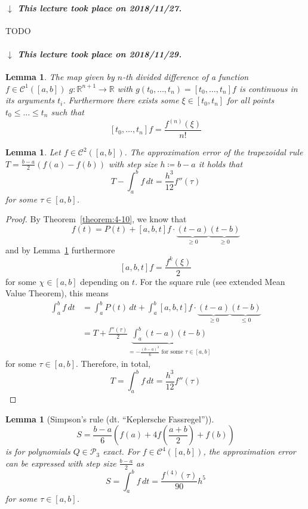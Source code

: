 \documentclass[a4paper]{article}
\newcounter{lecref}[section]
\numberwithin{lecref}{section}
\theoremstyle{break}
\newtheorem{lemma}[lecref]{Lemma}
\newcommand{\dateref}[1]{%
  \begin{mdframed}[backgroundcolor=gray!10,innerbottommargin=0pt,innertopmargin=0pt]
    \paragraph{\textit{$\downarrow$ This lecture took place on #1.}}%
  \end{mdframed}%
}
\newcommand{\dt}[1]{(dt. \enquote{\foreignlanguage{german}{#1}})}
\begin{document}
\dateref{2018/11/27}

TODO

\dateref{2018/11/29}

\begin{lemma}
  \label{lemma:5-6}
  The map given by $n$-th divided difference of a function $f \in \mathcal C^1([a, b])$ $g: \mathbb R^{n + 1} \to \mathbb R$ with $g(t_0, \dots, t_n) = [t_0, \dots, t_n] f$ is continuous in its arguments $t_i$. Furthermore there exists some $\xi \in [t_0, t_n]$ for all points $t_0 \leq \dots \leq t_n$ such that
  \[ [t_0, \dots, t_n] f = \frac{f^{(n)}(\xi)}{n!} \]
\end{lemma}

\begin{lemma}
  \label{lemma:5-7}
  Let $f \in \mathcal C^2([a,b])$. The approximation error of the trapezoidal rule $T = \frac{b - a}{2} (f(a) - f(b))$ with step size $h \coloneqq b - a$ it holds that
  \[ T - \int_a^b f \, dt = \frac{h^3}{12} f''(\tau) \]
  for some $\tau \in [a,b]$.
\end{lemma}

\begin{proof}
  By Theorem~\ref{theorem:4-10}, we know that
  \[ f(t) = P(t) + [a, b, t] f \cdot \underbrace{(t - a)}_{\geq 0} \underbrace{(t - b)}_{\geq 0} \]
  and by Lemma~\ref{lemma:5-6} furthermore
  \[ [a,b,t] f = \frac{f^k(\xi)}{2} \]
  for some $\chi \in [a,b]$ depending on $t$.
  For the square rule (see extended Mean Value Theorem), this means
  \begin{align*}
    \int_a^b f \, dt
      &= \int_a^b P(t) \, dt + \int_a^b [a, b, t] f \cdot \underbrace{(t - a)}_{\geq 0} \underbrace{(t - b)}_{\leq 0} \\
      &= T + \frac{f''(\tau)}{2} \underbrace{\int_a^b (t - a) (t - b)}_{= -\frac{(b - a)^3}{6} \text{ for some } \tau \in [a,b]}
  \end{align*}
  for some $\tau \in [a,b]$. Therefore, in total,
  \[ T = \int_a^b f \, dt = \frac{h^3}{12} f''(\tau) \]
\end{proof}

\begin{lemma}[Simpson's rule \dt{Keplersche Fassregel}]
  \label{lemma:5-8}
  \[ S = \frac{b - a}{6} (f(a) + 4f\left(\frac{a + b}{2}\right) + f(b)) \]
  is for polynomials $Q \in \mathcal P_3$ exact. For $f \in \mathcal C^4([a,b])$, the approximation error can be expressed with step size $\frac{b - a}{2}$ as
  \[ S = \int_a^b f \, dt = \frac{f^{(4)}(\tau)}{90} h^5 \]
  for some $\tau \in [a,b]$.
\end{lemma}
\end{document}
